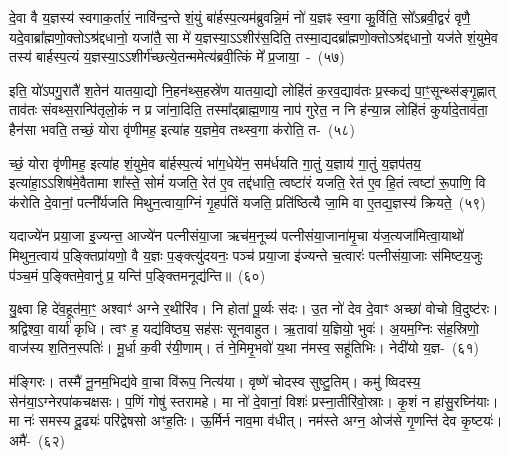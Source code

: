 {\anuvakamend[{श्रि॒तस्ते॒ प्र त्रि॒ष्टुभ॑मे॒तद्द्यावा॑\-पृथि॒वी या अया᳚क्ष्म प्रा॒णाने॒व षट्च॑त्वारिꣳशच्च}]}

दे॒वा वै य॒ज्ञस्य॑ स्वगाक॒र्तारं॒ नावि॑न्द॒न्ते शं॒युं बा॑र्\mbox{}हस्प॒त्य\-म॑ब्रुवन्नि॒मं नो॑ य॒ज्ञꣴ स्व॒गा कु॒र्विति॒ सो᳚\-ऽब्रवी॒द्वरं॑ वृणै॒ यदे॒वा\-ब्रा᳚ह्मणो॒क्तो\-ऽश्र॑द्दधानो॒ यजा॑तै॒ सा मे॑ य॒ज्ञस्या॒\-ऽऽ\-शीर॑स॒दिति॒ तस्मा॒द्यदब्रा᳚ह्मणो॒क्तो\-ऽश्र॑द्दधानो॒ यज॑ते शं॒युमे॒व तस्य॑ बार्\mbox{}हस्प॒त्यं य॒ज्ञस्या॒\-ऽऽ\-शीर्ग॑च्छ\-त्ये॒तन्ममेत्य॑ब्रवी॒त्किं मे᳚ प्र॒जाया॒~-~(५७)\ip

इति॒ यो॑\-ऽपगु॒रातै॑ श॒तेन॑ यातया॒द्यो नि॒हन॑थ्स॒हस्रे॑ण यातया॒द्यो लोहि॑तं क॒रव॒द्याव॑तः प्र॒स्कद्य॑ पा॒ꣳ॒सून्थ्स॑ङ्गृ॒ह्णात् ताव॑तः संवथ्स॒रान्पि॑तृलो॒कं न प्र जा॑ना॒दिति॒ तस्मा᳚द्\-ब्राह्म॒णाय॒ नाप॑ गुरेत॒ न नि ह॑न्या॒न्न लोहि॑तं कुर्यादे॒ताव॑ता॒ हैन॑सा भवति॒ तच्छं॒ योरा वृ॑णीमह॒ इत्या॑ह य॒ज्ञमे॒व तथ्स्व॒गा क॑रोति॒ त-~(५८)\ip

च्छं॒ योरा वृ॑णीमह॒ इत्या॑ह शं॒युमे॒व बा॑र्\mbox{}हस्प॒त्यं भा॑ग॒धेये॑न॒ सम॑र्धयति गा॒तुं य॒ज्ञाय॑ गा॒तुं य॒ज्ञप॑तय॒ इत्या॑हा॒\-ऽऽ\-शिष॑मे॒वैतामा शा᳚स्ते॒ सोमं॑ यजति॒ रेत॑ ए॒व तद्द॑धाति॒ त्वष्टा॑रं यजति॒ रेत॑ ए॒व हि॒तं त्वष्टा॑ रू॒पाणि॒ वि क॑रोति दे॒वानां॒ पत्नी᳚र्यजति मिथुन॒त्वाया॒ग्निं गृ॒हप॑तिं यजति॒ प्रति॑ष्ठित्यै जा॒मि वा ए॒तद्य॒ज्ञस्य॑ क्रियते॒~(५९)\ip

यदाज्ये॑न प्रया॒जा इ॒ज्यन्त॒ आज्ये॑न पत्नीसंया॒जा ऋच॑म॒नूच्य॑ पत्नीसंया॒जाना॑मृ॒चा य॑ज॒त्यजा॑मित्वा॒याथो॑ मिथुन॒त्वाय॑ प॒ङ्क्तिप्रा॑यणो॒ वै य॒ज्ञः प॒ङ्क्त्यु॑दयनः॒ पञ्च॑ प्रया॒जा इ॑ज्यन्ते च॒त्वारः॑ पत्नीसंया॒जाः स॑मिष्टय॒जुः प॑ञ्च॒मं प॒ङ्क्तिमे॒वानु॑ प्र॒ यन्ति॑ प॒ङ्क्तिमनूद्य॑न्ति॥~(६०)\ip

{\anuvakamend[{प्र॒जायाः᳚ करोति॒ तत्क्रि॑यते॒ त्रय॑स्त्रिꣳशच्च}]}%

यु॒क्ष्वा हि दे॑व॒हूत॑मा॒ꣳ॒ अश्वाꣳ॑ अग्ने र॒थीरि॑व। नि होता॑ पू॒र्व्यः स॑दः। उ॒त नो॑ देव दे॒वाꣳ अच्छा॑ वोचो वि॒दुष्ट॑रः। श्रद्विश्वा॒ वार्या॑ कृधि। त्वꣳ ह॒ यद्य॑विष्ठ्य॒ सह॑सः सूनवाहुत। ऋ॒तावा॑ य॒ज्ञियो॒ भुवः॑। अ॒यम॒ग्निः स॑ह॒स्रिणो॒ वाज॑स्य श॒तिन॒स्पतिः॑। मू॒र्धा क॒वी र॑यी॒णाम्। तं ने॒मिमृ॒भवो॑ य॒था न॑मस्व॒ सहू॑तिभिः। नेदी॑यो य॒ज्ञ-~(६१)\ip

म॑ङ्गिरः। तस्मै॑ नू॒नम॒भिद्य॑वे वा॒चा वि॑रूप॒ नित्य॑या। वृष्णे॑ चोदस्व सुष्टु॒तिम्। कमु॑ ष्विदस्य॒ सेन॑या॒\-ऽग्नेरपा॑कचक्षसः। प॒णिं गोषु॑ स्तरामहे। मा नो॑ दे॒वानां॒ विशः॑ प्रस्ना॒तीरि॑वो॒स्राः। कृ॒शं न हा॑सु॒रघ्नि॑याः। मा नः॑ समस्य दू॒ढ्यः॑ परि॑द्वेषसो अꣳह॒तिः। ऊ॒र्मिर्न नाव॒मा व॑धीत्। नम॑स्ते अग्न॒ ओज॑से गृ॒णन्ति॑ देव कृ॒ष्टयः॑। अमै॑-~(६२)\ip

